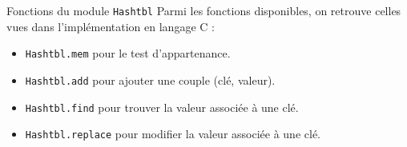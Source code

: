 \documentclass[10pt]{beamer}
\begin{document}
\begin{frame}{\Ctitle}{\stitle}
	\begin{block}{Fonctions du module {\tt Hashtbl}}
		Parmi les fonctions disponibles, on retrouve celles vues dans l'implémentation en langage C :
		\begin{itemize}
			\item<2-> \texttt{Hashtbl.mem} pour le test d'appartenance.
			\item<3-> \texttt{Hashtbl.add} pour ajouter une couple (clé, valeur).
			\item<4-> \texttt{Hashtbl.find} pour trouver la valeur associée à une clé.
			\item<5-> \texttt{Hashtbl.replace} pour modifier la valeur associée à une clé.
		\end{itemize}
	\end{block}
\end{frame}
\end{document}
